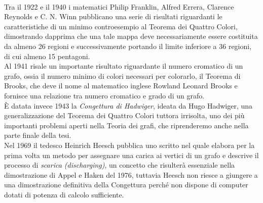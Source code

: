 \documentclass[a4paper,12pt,titlepage]{report}
\begin{document}
	 \\Tra il 1922 e il 1940 i matematici Philip Franklin, Alfred Errera, Clarence Reynolds e C. N. Winn pubblicano una serie di risultati riguardanti le caratteristiche di un minimo controesempio al Teorema dei Quattro Colori, dimostrando dapprima che una tale mappa deve necessariamente essere costituita da almeno 26 regioni e successivamente portando il limite inferiore a 36 regioni, di cui almeno 15 pentagoni.
	 \\Al 1941 risale un importante risultato riguardante il numero cromatico di un grafo, ossia il numero minimo di colori necessari per colorarlo, il Teorema di Brooks, che deve il nome al matematico inglese Rowland Leonard Brooks e fornisce una relazione tra numero cromatico e grado di un grafo.
	 \\È datata invece 1943 la \emph{Congettura di Hadwiger}, ideata da Hugo Hadwiger, una generalizzazione del Teorema dei Quattro Colori tuttora irrisolta, uno dei più importanti problemi aperti nella Teoria dei grafi, che riprenderemo anche nella parte finale della tesi.
	 \\Nel 1969 il tedesco Heinrich Heesch pubblica uno scritto {\bfseries \cite{Heesch}} nel quale elabora per la prima volta un metodo per assegnare una carica ai vertici di un grafo e descrive il processo di \emph{scarica (discharging)}, un concetto che risulterà essenziale nella dimostrazione di Appel e Haken del 1976, tuttavia Heesch non riesce a giungere a una dimostrazione definitiva della Congettura perché non dispone di computer dotati di potenza di calcolo sufficiente.
	 
\end{document}
